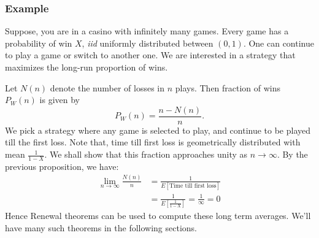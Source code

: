 \documentclass[a4paper,10pt]{article}
\begin{document}
\subsubsection{Example}
Suppose, you are in a casino with infinitely many games. Every game has a probability of win $X$, \emph{iid} uniformly distributed between $(0,1)$. One can continue to play a game or switch to another one. We are interested in a strategy that maximizes the long-run proportion of wins.

Let $N(n)$ denote the number of losses in $n$ plays. Then fraction of wins $P_W(n)$ is given by 
\begin{equation*}
P_W(n) = \frac{n-N(n)}{n}.
\end{equation*}
We pick a strategy where any game is selected to play, and continue to be played till the first loss. Note that, time till first loss is geometrically distributed with mean $\frac{1}{1-X}$. We shall show that this fraction approaches unity as $n \to \infty$. By the previous proposition, we have:
\begin{align*}
\lim_{n \to \infty} \frac{N(n)}{n} &= \frac{1}{E[\mbox{Time till first loss}]} \\
&= \frac{1}{E\left[\frac{1}{1-X}\right]} = \frac{1}{\infty} = 0
\end{align*}
Hence Renewal theorems can be used to compute these long term averages. We'll have many such theorems in the following sections.
\end{document}
